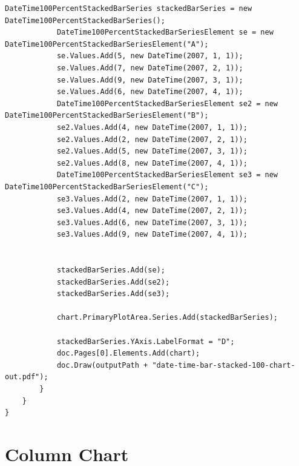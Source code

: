 \documentclass[american,letterpaper]{tufte-book}
\numberwithin{equation}{section}
\numberwithin{figure}{section}
\begin{document}
{\begin{lstlisting}[caption={Stacked 100\% data/time bar chart.},label={lis:Stacked-100=000025-data/time},basicstyle={\small\ttfamily},breaklines=true]
            DateTime100PercentStackedBarSeries stackedBarSeries = new DateTime100PercentStackedBarSeries();
            DateTime100PercentStackedBarSeriesElement se = new DateTime100PercentStackedBarSeriesElement("A");
            se.Values.Add(5, new DateTime(2007, 1, 1));
            se.Values.Add(7, new DateTime(2007, 2, 1));
            se.Values.Add(9, new DateTime(2007, 3, 1));
            se.Values.Add(6, new DateTime(2007, 4, 1));
            DateTime100PercentStackedBarSeriesElement se2 = new DateTime100PercentStackedBarSeriesElement("B");
            se2.Values.Add(4, new DateTime(2007, 1, 1));
            se2.Values.Add(2, new DateTime(2007, 2, 1));
            se2.Values.Add(5, new DateTime(2007, 3, 1));
            se2.Values.Add(8, new DateTime(2007, 4, 1));
            DateTime100PercentStackedBarSeriesElement se3 = new DateTime100PercentStackedBarSeriesElement("C");
            se3.Values.Add(2, new DateTime(2007, 1, 1));
            se3.Values.Add(4, new DateTime(2007, 2, 1));
            se3.Values.Add(6, new DateTime(2007, 3, 1));
            se3.Values.Add(9, new DateTime(2007, 4, 1));

           
            stackedBarSeries.Add(se);
            stackedBarSeries.Add(se2);
            stackedBarSeries.Add(se3);

            chart.PrimaryPlotArea.Series.Add(stackedBarSeries);

            stackedBarSeries.YAxis.LabelFormat = "D";
            doc.Pages[0].Elements.Add(chart);
            doc.Draw(outputPath + "date-time-bar-stacked-100-chart-out.pdf");
        }
    }
}
\end{lstlisting}
\leavevmode\egroup

\section{Column Chart}\label{sec:Column-Chart}

}
\end{document}
